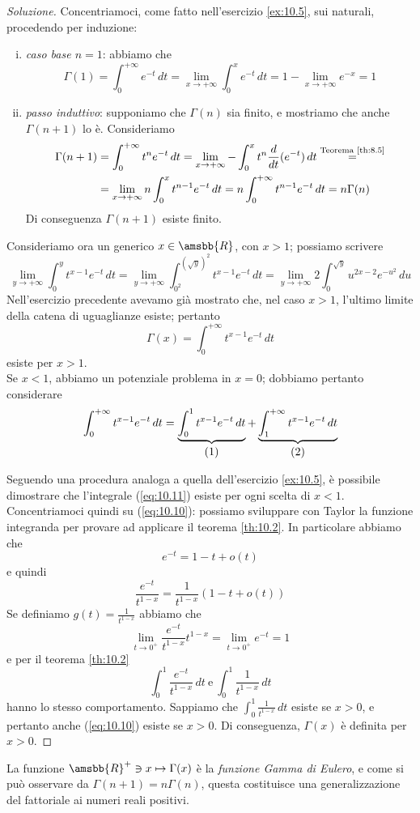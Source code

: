 \begin{proof}[Soluzione]
    Concentriamoci, come fatto nell'esercizio \ref{ex:10.5}, sui naturali, procedendo per induzione:
    \begin{enumerate}[(i)]
        \item \emph{caso base $n=1$}: abbiamo che
        \[
        \Gamma(1) = \int_0^{+\infty} e^{-t}\, dt = \lim_{x\to +\infty} \int_0^x e^{-t}\, dt = 1-\lim_{x\to+\infty}e^{-x} = 1 
        \]
        \item \emph{passo induttivo}: supponiamo che $\Gamma(n)$ sia finito, e mostriamo che anche $\Gamma(n+1)$ lo è. Consideriamo
        \[
        \begin{split}
            \Gamma(n+1) & = \int_0^{+\infty} t^n e^{-t}\, dt = \lim_{x\to +\infty} -\int_0^x t^{n}\frac{d}{dt}(e^{-t})\, dt \overset{\text{Teorema \ref{th:8.5}}}{=} \\
            & = \lim_{x\to+\infty} n\int_0^x t^{n-1} e^{-t}\, dt = n \int_0^{+\infty} t^{n-1}e^{-t}\, dt = n\Gamma(n)
        \end{split}
        \]
        Di conseguenza $\Gamma(n+1)$ esiste finito.
    \end{enumerate}
    Consideriamo ora un generico $x\in\amsbb{R}$, con $x>1$; possiamo scrivere
    \[
    \lim_{y\to +\infty} \int_0^{y} t^{x-1} e^{-t}\, dt = \lim_{y\to+\infty} \int_{0^2}^{(\sqrt{y})^2} t^{x-1}e^{-t}\, dt = \lim_{y\to +\infty} 2\int_0^{\sqrt{y}} u^{2x-2} e^{-u^2} \, du 
    \]
    Nell'esercizio precedente avevamo già mostrato che, nel caso $x>1$, l'ultimo limite della catena di uguaglianze esiste; pertanto
    \[
    \Gamma(x) = \int_0^{+\infty} t^{x-1} e^{-t}\, dt
    \]
    esiste per $x>1$.\\
    Se $x<1$, abbiamo un potenziale problema in $x=0$; dobbiamo pertanto considerare
    \[
    \int_0^{+\infty} t^{x-1} e^{-t}\, dt = \underbrace{\int_0^1 t^{x-1}e^{-t}\, dt}_{\stepcounter{equation}\mbox{(\theequation)}} + \underbrace{\int_1^{+\infty}t^{x-1}e^{-t}\, dt}_{\stepcounter{equation}\mbox{(\theequation)}} 
    \]
    \addtocounter{equation}{-2}\label{eq:10.10}
    \addtocounter{equation}{0}\label{eq:10.11}
    Seguendo una procedura analoga a quella dell'esercizio \ref{ex:10.5}, è possibile dimostrare che l'integrale (\ref{eq:10.11}) esiste per ogni scelta di $x<1$. Concentriamoci quindi su (\ref{eq:10.10}): possiamo sviluppare con Taylor la funzione integranda per provare ad applicare il teorema \ref{th:10.2}. In particolare abbiamo che
    \[
    e^{-t} = 1-t +o(t)
    \]
    e quindi 
    \[
    \frac{e^{-t}}{t^{1-x}} = \frac{1}{t^{1-x}}(1-t+o(t))
    \]
    Se definiamo $g(t) = \frac{1}{t^{1-x}}$ abbiamo che
    \[
    \lim_{t\to 0^+} \frac{e^{-t}}{t^{1-x}}t^{1-x} = \lim_{t\to0^+} e^{-t} = 1
    \]
    e per il teorema \ref{th:10.2}
    \[
    \int_0^1 \frac{e^{-t}}{t^{1-x}}\, dt \ \text{e} \ \int_0^1 \frac{1}{t^{1-x}}\, dt
    \]
    hanno lo stesso comportamento. Sappiamo che $\int_0^1 \frac{1}{t^{1-x}}\, dt$ esiste se $x>0$, e pertanto anche (\ref{eq:10.10}) esiste se $x>0$. Di conseguenza, $\Gamma(x)$ è definita per $x>0$.
\end{proof}
\begin{remark}
    La funzione $\amsbb{R}^+\ni x \mapsto \Gamma(x)$ è la \emph{funzione Gamma di Eulero}, e come si può osservare da $\Gamma(n+1) = n \Gamma(n)$, questa costituisce una generalizzazione del fattoriale ai numeri reali positivi.
\end{remark}
\newpage